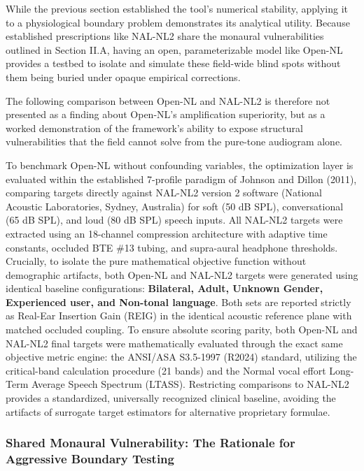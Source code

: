 \documentclass[
  12pt,
]{article}
\begin{document}
While the previous section established the tool's numerical stability,
applying it to a physiological boundary problem demonstrates its
analytical utility. Because established prescriptions like NAL-NL2 share
the monaural vulnerabilities outlined in Section II.A, having an open,
parameterizable model like Open-NL provides a testbed to isolate and
simulate these field-wide blind spots without them being buried under
opaque empirical corrections.

The following comparison between Open-NL and NAL-NL2 is therefore not
presented as a finding about Open-NL's amplification superiority, but as
a worked demonstration of the framework's ability to expose structural
vulnerabilities that the field cannot solve from the pure-tone audiogram
alone.

To benchmark Open-NL without confounding variables, the optimization
layer is evaluated within the established 7-profile paradigm of Johnson
and Dillon (2011), comparing targets directly against NAL-NL2 version 2
software (National Acoustic Laboratories, Sydney, Australia) for soft
(50 dB SPL), conversational (65 dB SPL), and loud (80 dB SPL) speech
inputs. All NAL-NL2 targets were extracted using an 18-channel
compression architecture with adaptive time constants, occluded BTE \#13
tubing, and supra-aural headphone thresholds. Crucially, to isolate the
pure mathematical objective function without demographic artifacts, both
Open-NL and NAL-NL2 targets were generated using identical baseline
configurations: \textbf{Bilateral, Adult, Unknown Gender, Experienced
user, and Non-tonal language}. Both sets are reported strictly as
Real-Ear Insertion Gain (REIG) in the identical acoustic reference plane
with matched occluded coupling. To ensure absolute scoring parity, both
Open-NL and NAL-NL2 final targets were mathematically evaluated through
the exact same objective metric engine: the ANSI/ASA S3.5-1997 (R2024)
standard, utilizing the critical-band calculation procedure (21 bands)
and the Normal vocal effort Long-Term Average Speech Spectrum (LTASS).
Restricting comparisons to NAL-NL2 provides a standardized, universally
recognized clinical baseline, avoiding the artifacts of surrogate target
estimators for alternative proprietary formulae.

\subsubsection{Shared Monaural Vulnerability: The Rationale for
Aggressive Boundary
Testing}\label{shared-monaural-vulnerability-the-rationale-for-aggressive-boundary-testing}
\end{document}

